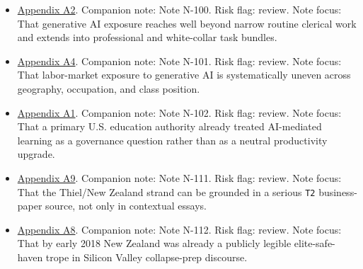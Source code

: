 \documentclass[
  american,
  11pt,
  letterpaper,
]{article}
\begin{document}
\begin{itemize}
  Dion Wiggins publicly frames sovereignty in survivability terms and
  links continuity to disguised dependency.
\item
  \hyperref[appendix-a2-gpts-are-gpts-an-early-look-at-the-labor-market-impact-potential-of-large-language-models]{Appendix
  A2}. Companion note: Note N-100. Risk flag: review. Note focus: That
  generative AI exposure reaches well beyond narrow routine clerical
  work and extends into professional and white-collar task bundles.
\item
  \hyperref[appendix-a4-gen-ai-artificial-intelligence-and-the-future-of-work]{Appendix
  A4}. Companion note: Note N-101. Risk flag: review. Note focus: That
  labor-market exposure to generative AI is systematically uneven across
  geography, occupation, and class position.
\item
  \hyperref[appendix-a1-artificial-intelligence-and-the-future-of-teaching-and-learning-insights-and-recommendations]{Appendix
  A1}. Companion note: Note N-102. Risk flag: review. Note focus: That a
  primary U.S. education authority already treated AI-mediated learning
  as a governance question rather than as a neutral productivity
  upgrade.
\item
  \hyperref[appendix-a9-new-zealand-woos-the-wealthy-with-golden-visa-changes]{Appendix
  A9}. Companion note: Note N-111. Risk flag: review. Note focus: That
  the Thiel/New Zealand strand can be grounded in a serious \texttt{T2}
  business-paper source, not only in contextual essays.
\item
  \hyperref[appendix-a8-why-silicon-valley-billionaires-are-prepping-for-the-apocalypse-in-new-zealand]{Appendix
  A8}. Companion note: Note N-112. Risk flag: review. Note focus: That
  by early 2018 New Zealand was already a publicly legible
  elite-safe-haven trope in Silicon Valley collapse-prep discourse.
\end{itemize}
\end{document}
